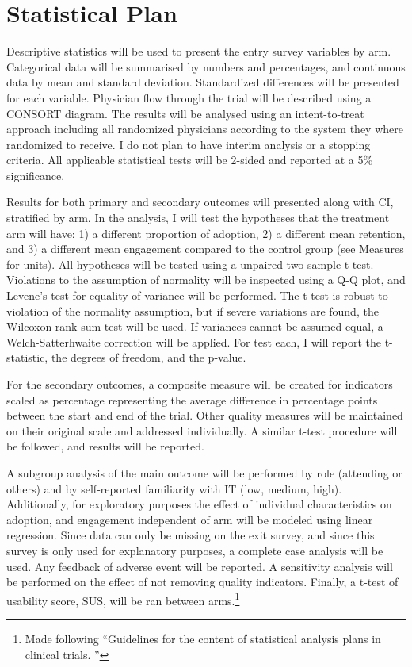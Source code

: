 \section{Statistical Plan}
Descriptive statistics will be used to present the entry survey variables by arm. Categorical data will be summarised by numbers and percentages, and continuous data by mean and standard deviation. Standardized differences will be presented for each variable. Physician flow through the trial will be described using a CONSORT diagram.
The results will be analysed using an intent-to-treat approach including all randomized physicians according to the system they where randomized to receive. I do not plan to have interim analysis or a stopping criteria. All applicable statistical tests will be 2-sided and reported at a 5\% significance.

Results for both primary and secondary outcomes will presented along with CI, stratified by arm. In the analysis, I will test the hypotheses that the treatment arm will have: 1) a different proportion of adoption, 2) a different mean retention, and 3) a different mean engagement compared to the control group (see Measures for units). All hypotheses will be tested using a unpaired two-sample t-test. Violations to the assumption of normality will be inspected using a Q-Q plot, and Levene's test for equality of variance will be performed. The t-test is robust to violation of the normality assumption, but if severe variations are found, the Wilcoxon rank sum test will be used. If variances cannot be assumed equal, a Welch-Satterhwaite correction will be applied. For test each, I will report the t-statistic, the degrees of freedom, and the p-value.

For the secondary outcomes, a composite measure will be created for indicators scaled as percentage representing the average difference in percentage points between the start and end of the trial. Other quality measures will be maintained on their original scale and addressed individually. A similar t-test procedure will be followed, and results will be reported.

A subgroup analysis of the main outcome will be performed by role (attending or others) and by self-reported familiarity with IT (low, medium, high). Additionally, for exploratory purposes the effect of individual characteristics on adoption, and engagement independent of arm will be modeled using linear regression. Since data can only be missing on the exit survey, and since this survey is only used for explanatory purposes, a complete case analysis will be used. Any feedback of adverse event will be reported. A sensitivity analysis will be performed on the effect of not removing quality indicators. Finally, a t-test of usability score, SUS, will be ran between arms.\footnote{Made following ``Guidelines for the content of statistical analysis plans in clinical trials. \cite{gamble2017guidelines}''}

